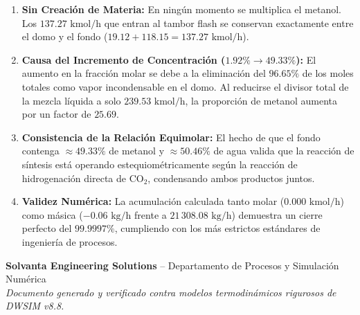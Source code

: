 \documentclass[11pt,letterpaper]{article}
\begin{document}
\begin{enumerate}[itemsep=4pt]
    \item \textbf{Sin Creación de Materia:} En ningún momento se multiplica el metanol. Los $137.27\text{ kmol/h}$ que entran al tambor flash se conservan exactamente entre el domo y el fondo ($19.12 + 118.15 = 137.27\text{ kmol/h}$).
    \item \textbf{Causa del Incremento de Concentración ($1.92\% \to 49.33\%$):} El aumento en la fracción molar se debe a la eliminación del $96.65\%$ de los moles totales como vapor incondensable en el domo. Al reducirse el divisor total de la mezcla líquida a solo $239.53\text{ kmol/h}$, la proporción de metanol aumenta por un factor de $25.69$.
    \item \textbf{Consistencia de la Relación Equimolar:} El hecho de que el fondo contenga $\approx 49.33\%$ de metanol y $\approx 50.46\%$ de agua valida que la reacción de síntesis está operando estequiométricamente según la reacción de hidrogenación directa de $\text{CO}_2$, condensando ambos productos juntos.
    \item \textbf{Validez Numérica:} La acumulación calculada tanto molar ($0.000\text{ kmol/h}$) como másica ($-0.06\text{ kg/h}$ frente a $21\,308.08\text{ kg/h}$) demuestra un cierre perfecto del $99.9997\%$, cumpliendo con los más estrictos estándares de ingeniería de procesos.
\end{enumerate}

\vspace{0.4cm}
\begin{center}
    \small\color{navyblue}\textbf{Solvanta Engineering Solutions} -- Departamento de Procesos y Simulación Numérica\\
    \textit{Documento generado y verificado contra modelos termodinámicos rigurosos de DWSIM v8.8.}
\end{center}
\end{document}
